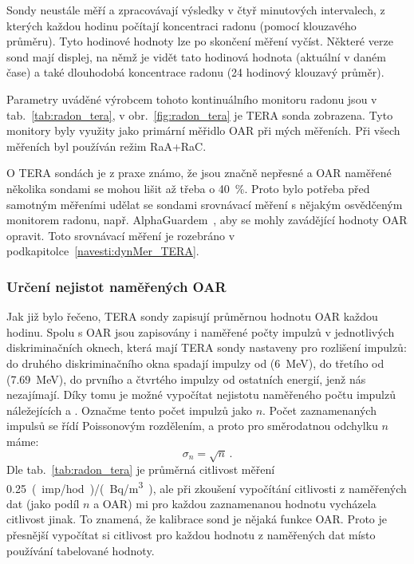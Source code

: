 Sondy neustále měří a zpracovávají výsledky v čtyř minutových intervalech, z kterých každou hodinu počítají koncentraci radonu (pomocí klouzavého průměru). Tyto hodinové hodnoty lze po skončení měření vyčíst. Některé verze sond mají displej, na němž je vidět tato hodinová hodnota (aktuální v daném čase) a také dlouhodobá koncentrace radonu (24 hodinový klouzavý průměr). \cite{tera}

Parametry uváděné výrobcem tohoto kontinuálního monitoru radonu jsou v tab.~\ref{tab:radon_tera}, v obr.~\ref{fig:radon_tera} je TERA sonda zobrazena. Tyto monitory byly využity jako primární měřidlo OAR při mých měřeních. Při všech měřeních byl používán režim RaA+RaC.

O TERA sondách je z praxe známo, že jsou značně nepřesné a OAR naměřené několika sondami se mohou lišit až třeba o 40~\%. Proto bylo potřeba před samotným měřeními udělat se sondami srovnávací měření s nějakým osvědčeným monitorem radonu, např. AlphaGuardem~\cite{alphaguard}, aby se mohly zavádějící hodnoty OAR opravit. Toto srovnávací měření je rozebráno v podkapitolce~\ref{navesti:dynMer_TERA}.

\subsubsection{Určení nejistot naměřených OAR}\label{navesti:radon_TERAnejistota}
Jak již bylo řečeno, TERA sondy zapisují průměrnou hodnotu OAR každou hodinu. Spolu s OAR jsou zapisovány i naměřené počty impulzů v jednotlivých diskriminačních oknech, která mají TERA sondy nastaveny pro rozlišení impulzů: do druhého diskriminačního okna spadají impulzy od  (\SI{6}{MeV}), do třetího od  (\SI{7.69}{MeV}), do prvního a čtvrtého impulzy od ostatních energií, jenž nás nezajímají. Díky tomu je možné vypočítat nejistotu naměřeného počtu impulzů náležejících  a . Označme tento počet impulzů jako $n$. Počet zaznamenaných impulsů se řídí Poissonovým rozdělením, a proto pro směrodatnou odchylku $n$ máme:
\begin{equation}
    \sigma_n=\sqrt{n}\,.
    \label{eq:radon_n_odchylka}
\end{equation}
Dle tab.~\ref{tab:radon_tera} je průměrná citlivost měření \SI{0.25}{(imp/hod)/(Bq/m^3)}, ale při zkoušení vypočítání citlivosti z naměřených dat (jako podíl $n$ a OAR) mi pro každou zaznamenanou hodnotu vycházela citlivost jinak. To znamená, že kalibrace sond je nějaká funkce OAR. Proto je přesnější vypočítat si citlivost pro každou hodnotu z naměřených dat místo používání tabelované hodnoty.

